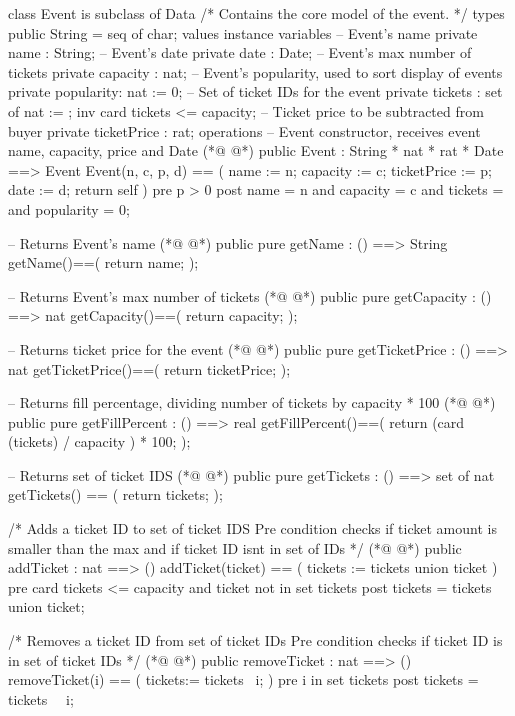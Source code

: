 \begin{vdmpp}[breaklines=true]
class Event is subclass of Data
/*
  Contains the core model of the event.
*/
types
  public String = seq of char;
values
instance variables
 -- Event's name
 private name : String;
 -- Event's date
 private date : Date;
 -- Event's max number of tickets
 private capacity : nat;
 -- Event's popularity, used to sort display of events
 private popularity: nat := 0;
 -- Set of ticket IDs for the event
 private tickets : set of nat := {};
  inv card tickets <= capacity;
 -- Ticket price to be subtracted from buyer
 private ticketPrice : rat;
operations
 -- Event constructor, receives event name, capacity, price and Date
(*@
\label{Event:24}
@*)
 public Event : String * nat * rat * Date ==> Event
 Event(n, c, p, d) == (
  name := n; 
  capacity := c; 
  ticketPrice := p;
  date := d; 
  return self
 )
 pre p > 0
 post name = n and capacity = c and tickets = {} and popularity = 0;
    
 -- Returns Event's name
(*@
\label{getName:36}
@*)
 public pure getName : () ==> String
 getName()==(
  return name;
 );
 
 -- Returns Event's max number of tickets
(*@
\label{getCapacity:42}
@*)
 public pure getCapacity : () ==> nat
 getCapacity()==(
  return capacity;
 );
 
 -- Returns ticket price for the event
(*@
\label{getTicketPrice:48}
@*)
 public pure getTicketPrice : () ==> nat
 getTicketPrice()==(
  return ticketPrice;
 );
 
 -- Returns fill percentage, dividing number of tickets by capacity * 100
(*@
\label{getFillPercent:54}
@*)
 public pure getFillPercent : () ==> real
 getFillPercent()==(
  return (card (tickets) / capacity ) * 100;
 );
 
 -- Returns set of ticket IDS
(*@
\label{getTickets:60}
@*)
 public pure getTickets : () ==> set of nat
 getTickets() == (
  return tickets;
 );
 
 /*
  Adds a ticket ID to set of ticket IDS
  Pre condition checks if ticket amount is smaller than the max and if ticket ID isnt in set of IDs
 */
(*@
\label{addTicket:69}
@*)
 public addTicket : nat ==> ()
 addTicket(ticket) == (
  tickets := tickets union {ticket}
 )
 pre card tickets <= capacity and ticket not in set tickets
 post tickets = tickets~ union {ticket};
 
 /*
  Removes a ticket ID from set of ticket IDs
  Pre condition checks if ticket ID is in set of ticket IDs
 */
(*@
\label{removeTicket:80}
@*)
 public removeTicket : nat ==> ()
 removeTicket(i) == (
  tickets:= tickets \ {i}; 
 )
 pre i in set tickets
 post tickets = tickets~ \ {i}; 
 

\end{vdmpp}
